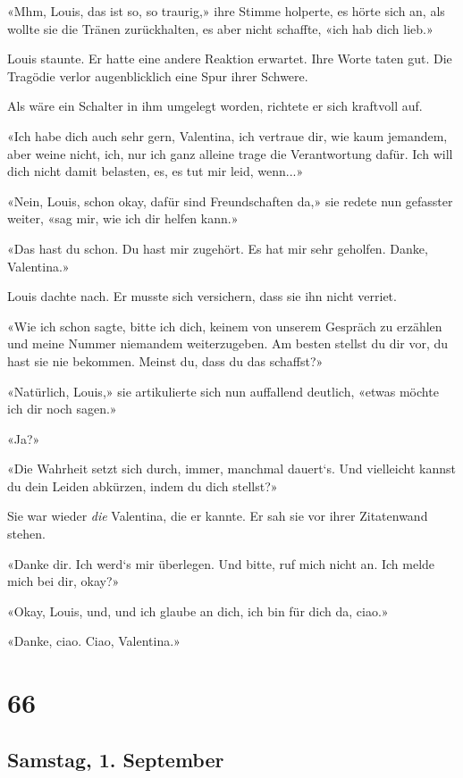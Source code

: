 «Mhm, Louis, das ist so, so traurig,» ihre Stimme holperte, es hörte
sich an, als wollte sie die Tränen zurückhalten, es aber nicht schaffte,
«ich hab dich lieb.»

Louis staunte. Er hatte eine andere Reaktion erwartet. Ihre Worte taten
gut. Die Tragödie verlor augenblicklich eine Spur ihrer Schwere.

Als wäre ein Schalter in ihm umgelegt worden, richtete er sich kraftvoll
auf.

«Ich habe dich auch sehr gern, Valentina, ich vertraue dir, wie kaum
jemandem, aber weine nicht, ich, nur ich ganz alleine trage die
Verantwortung dafür. Ich will dich nicht damit belasten, es, es tut mir
leid, wenn...»

«Nein, Louis, schon okay, dafür sind Freundschaften da,» sie redete nun
gefasster weiter, «sag mir, wie ich dir helfen kann.»

«Das hast du schon. Du hast mir zugehört. Es hat mir sehr geholfen.
Danke, Valentina.»

Louis dachte nach. Er musste sich versichern, dass sie ihn nicht
verriet.

«Wie ich schon sagte, bitte ich dich, keinem von unserem Gespräch zu
erzählen und meine Nummer niemandem weiterzugeben. Am besten stellst du
dir vor, du hast sie nie bekommen. Meinst du, dass du das schaffst?»

«Natürlich, Louis,» sie artikulierte sich nun auffallend deutlich,
«etwas möchte ich dir noch sagen.»

«Ja?»

«Die Wahrheit setzt sich durch, immer, manchmal dauert`s. Und vielleicht
kannst du dein Leiden abkürzen, indem du dich stellst?»

Sie war wieder \emph{die} Valentina, die er kannte. Er sah sie vor ihrer
Zitatenwand stehen.

«Danke dir. Ich werd`s mir überlegen. Und bitte, ruf mich nicht an. Ich
melde mich bei dir, okay?»

«Okay, Louis, und, und ich glaube an dich, ich bin für dich da, ciao.»

«Danke, ciao. Ciao, Valentina.»

\chapter{66}\label{section-66}

\section{Samstag, 1. September}\label{samstag-1.-september}

